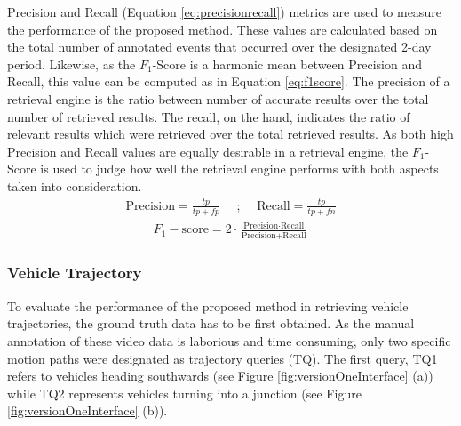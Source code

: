 Precision and Recall (Equation \ref{eq:precisionrecall}) metrics are used to measure the performance of the proposed method. These values are calculated based on the total number of annotated events that occurred over the designated 2-day period.
Likewise, as the $F_1$-Score is a harmonic mean between Precision and Recall, this value can be computed as in Equation \ref{eq:f1score}. The precision of a retrieval engine is the ratio between number of accurate results over the total number of retrieved results. The recall, on the hand, indicates the ratio of relevant results which were retrieved over the total retrieved results. As both high Precision and Recall values are equally desirable in a retrieval
engine, the $F_1$-Score is used to judge how well the retrieval engine performs with both aspects taken into consideration.
\begin{align}
\label{eq:precisionrecall}
    \text{Precision} = \frac{tp}{tp + fp}   \hspace{1em} \text{ ; }  \hspace{1em} \text{Recall}  = \frac{tp}{tp + fn}
\end{align}
\begin{align}
\label{eq:f1score}
F_{1}-\text{score}  = 2\cdot\frac{\text{Precision} \cdot \text{Recall}}{\text{Precision} + \text{Recall}}
\end{align}

\subsubsection{Vehicle Trajectory}

To evaluate the performance of the proposed method in retrieving vehicle trajectories, the ground truth data has to be first obtained. As the manual annotation of these video data is laborious and time consuming, only two specific motion paths were designated as trajectory queries (TQ). The first query, TQ1 refers to vehicles heading southwards (see Figure
\ref{fig:versionOneInterface} (a)) while TQ2 represents vehicles turning into
a junction (see Figure \ref{fig:versionOneInterface} (b)).

